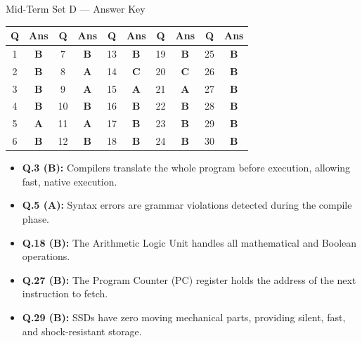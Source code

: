 \begin{answerkeytable}{Mid-Term Set D --- Answer Key}
\begin{tabular}{*{10}{c}}
\toprule
\textbf{Q} & \textbf{Ans} & \textbf{Q} & \textbf{Ans} & \textbf{Q} & \textbf{Ans} & \textbf{Q} & \textbf{Ans} & \textbf{Q} & \textbf{Ans} \\
\midrule
1 & \textbf{B} & 7 & \textbf{B} & 13 & \textbf{B} & 19 & \textbf{B} & 25 & \textbf{B} \\
2 & \textbf{B} & 8 & \textbf{A} & 14 & \textbf{C} & 20 & \textbf{C} & 26 & \textbf{B} \\
3 & \textbf{B} & 9 & \textbf{A} & 15 & \textbf{A} & 21 & \textbf{A} & 27 & \textbf{B} \\
4 & \textbf{B} & 10 & \textbf{B} & 16 & \textbf{B} & 22 & \textbf{B} & 28 & \textbf{B} \\
5 & \textbf{A} & 11 & \textbf{A} & 17 & \textbf{B} & 23 & \textbf{B} & 29 & \textbf{B} \\
6 & \textbf{B} & 12 & \textbf{B} & 18 & \textbf{B} & 24 & \textbf{B} & 30 & \textbf{B} \\
\bottomrule
\end{tabular}
\end{answerkeytable}

\begin{expbox}
\begin{itemize}[leftmargin=5mm]
    \item \textbf{Q.3 (B):} Compilers translate the whole program before execution, allowing fast, native execution.
    \item \textbf{Q.5 (A):} Syntax errors are grammar violations detected during the compile phase.
    \item \textbf{Q.18 (B):} The Arithmetic Logic Unit handles all mathematical and Boolean operations.
    \item \textbf{Q.27 (B):} The Program Counter (PC) register holds the address of the next instruction to fetch.
    \item \textbf{Q.29 (B):} SSDs have zero moving mechanical parts, providing silent, fast, and shock-resistant storage.
\end{itemize}
\end{expbox}

\newpage
